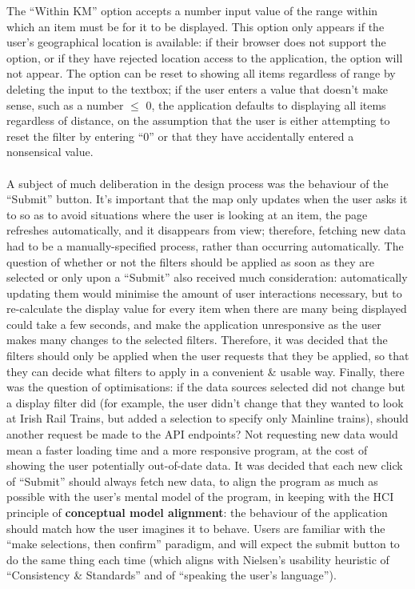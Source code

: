 \documentclass[a4paper,11pt]{report}
\begin{document}
The ``Within KM'' option accepts a number input value of the range within which an item must be for it to be displayed.
This option only appears if the user's geographical location is available: if their browser does not support the option, or if they have rejected location access to the application, the option will not appear.
The option can be reset to showing all items regardless of range by deleting the input to the textbox;
if the user enters a value that doesn't make sense, such as a number $\leq$ 0, the application defaults to displaying all items regardless of distance, on the assumption that the user is either attempting to reset the filter by entering ``0'' or that they have accidentally entered a nonsensical value.
\\\\
A subject of much deliberation in the design process was the behaviour of the ``Submit'' button.
It's important that the map only updates when the user asks it to so as to avoid situations where the user is looking at an item, the page refreshes automatically, and it disappears from view;
therefore, fetching new data had to be a manually-specified process, rather than occurring automatically.
The question of whether or not the filters should be applied as soon as they are selected or only upon a ``Submit'' also received much consideration:
automatically updating them would minimise the amount of user interactions necessary, but to re-calculate the display value for every item when there are many being displayed could take a few seconds, and make the application unresponsive as the user makes many changes to the selected filters.
Therefore, it was decided that the filters should only be applied when the user requests that they be applied, so that they can decide what filters to apply in a convenient \& usable way.
Finally, there was the question of optimisations:
if the data sources selected did not change but a display filter did (for example, the user didn't change that they wanted to look at Irish Rail Trains, but added a selection to specify only Mainline trains), should another request be made to the API endpoints?
Not requesting new data would mean a faster loading time and a more responsive program, at the cost of showing the user potentially out-of-date data.
It was decided that each new click of ``Submit'' should always fetch new data, to align the program as much as possible with the user's mental model of the program, in keeping with the HCI principle of \textbf{conceptual model alignment}\supercite{norman_design_2013}: the behaviour of the application should match how the user imagines it to behave.
Users are familiar with the ``make selections, then confirm'' paradigm, and will expect the submit button to do the same thing each time (which aligns with Nielsen's usability heuristic of ``Consistency \& Standards'' and of ``speaking the user's language''\supercite{nielsenheuristics}).
\end{document}
